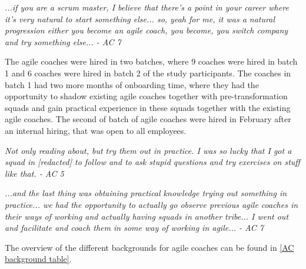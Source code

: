 \documentclass[11pt,a4paper]{report}
\begin{document}
\begin{displayquote}
\textit{
...if you are a scrum master, I believe that there's a point in your career where it's very natural to start something else... so, yeah for me, it was a natural progression either you become an agile coach, you become, you switch company and try something else... - AC 7
}
\end{displayquote}

\noindent The agile coaches were hired in two batches, where 9 coaches were hired in batch 1 and 6 coaches were hired in batch 2 of the study participants. The coaches in batch 1 had two more months of onboarding time, where they had the opportunity to shadow existing agile coaches together with pre-transformation squads and gain practical experience in these squads together with the existing agile coaches. The second of batch of agile coaches were hired in February after an internal hiring, that was open to all employees.  

\begin{displayquote}
\textit{
Not only reading about, but try them out in practice. I was so lucky that I got a squad in [redacted] to follow and to ask stupid questions and try exercises on stuff like that. - AC 5
}
\end{displayquote}
\begin{displayquote}
\textit{
...and the last thing was obtaining practical knowledge trying out something in practice... we had the opportunity to actually go observe previous agile coaches in their ways of working and actually having squads in another tribe... I went out and facilitate and coach them in some way of working in agile... - AC 7
}
\end{displayquote}
The overview of the different backgrounds for agile coaches can be found in \autoref{AC background table}.
\end{document}
